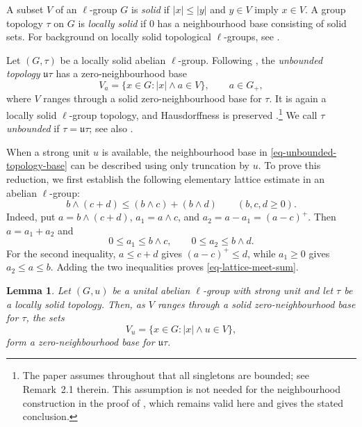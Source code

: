 \documentclass[preprint,3p]{elsarticle}
\theoremstyle{plain}
\newtheorem{lem}[thm]{Lemma}
\theoremstyle{definition}
\numberwithin{equation}{section}
\begin{document}
A subset $V$ of an $\ell$-group $G$ is \emph{solid} if
$|x|\leq|y|$ and $y\in V$ imply $x\in V$.  A group topology $\tau$ on
$G$ is \emph{locally solid} if $0$ has a neighbourhood base consisting of
solid sets.  For background on locally solid topological $\ell$-groups,
see \cite{Khan2007,Hong2015}.

Let $(G,\tau)$ be a locally solid abelian $\ell$-group.  Following
\cite{Zabeti2020}, the \emph{unbounded topology} $\mathfrak u\tau$ has a
zero-neighbourhood base
\begin{equation}
\label{eq-unbounded-topology-base}
 V_a=\{x\in G:|x|\wedge a\in V\},
 \qquad a\in G_+,
\end{equation}
where $V$ ranges through a solid zero-neighbourhood base for $\tau$.
It is again a locally solid $\ell$-group topology, and Hausdorffness is
preserved \cite[Theorem~2.11]{Zabeti2020}.\footnote{The paper
\cite{Zabeti2020} assumes throughout that all singletons are bounded;
see Remark~2.1 therein.  This assumption is not needed for the
neighbourhood construction in the proof of \cite[Theorem~2.11]{Zabeti2020}, 
which remains valid here and gives the stated conclusion.}
We call $\tau$ \emph{unbounded}
if $\tau=\mathfrak u\tau$; see also \cite{Abela2023}.

When a strong unit $u$ is available, the neighbourhood base in
\eqref{eq-unbounded-topology-base} can be described using only
truncation by $u$.
To prove this reduction, we first establish the following elementary
lattice estimate in an abelian $\ell$-group:
\begin{equation}
\label{eq-lattice-meet-sum}
 b\wedge(c+d)\leq(b\wedge c)+(b\wedge d)
 \qquad(b,c,d\geq0).
\end{equation}
Indeed, put $a=b\wedge(c+d)$, $a_1=a\wedge c$, and
$a_2=a-a_1=(a-c)^+$.  Then $a=a_1+a_2$ and
\[
 0\leq a_1\leq b\wedge c,
 \qquad
 0\leq a_2\leq b\wedge d.
\]
For the second inequality, $a\leq c+d$ gives $(a-c)^+\leq d$,
while $a_1\geq0$ gives $a_2\leq a\leq b$.
Adding the two inequalities proves \eqref{eq-lattice-meet-sum}.

\begin{lem}
\label{lem-strong-unit-unbounded}
Let $(G,u)$ be a unital abelian $\ell$-group with strong unit and let
$\tau$ be a locally solid topology.  Then, as $V$ ranges through a solid
zero-neighbourhood base for $\tau$, the sets
\begin{equation}
\label{eq-strong-unit-unbounded-base}
 V_u=\{x\in G:|x|\wedge u\in V\},
\end{equation}
form a zero-neighbourhood base for $\mathfrak u\tau$.
\end{lem}
\end{document}
